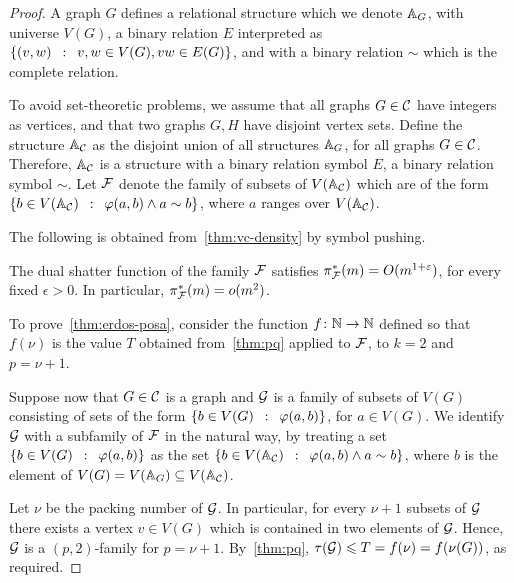 \begin{proof}
	A graph $G$ %
	defines a relational structure which we denote 
	$\str A_{G}$, with universe $V(G)$,
	a binary relation $E$ interpreted as $\setof{(v,w)}{v,w\in V(G),vw\in E(G)}$,  
	and with a binary relation $\sim$ which is the complete relation.
	
	To avoid set-theoretic problems, we assume that all graphs $G\in \CCC$ have integers as vertices, and that two graphs $G,H$ have disjoint vertex sets.
		Define the structure $\str A_{\CCC}$ as the disjoint union of all structures $\str A_{G}$,
	for all graphs $G\in \CCC$. Therefore, $\str A_{\CCC}$
	is a structure with a binary relation symbol $E$,
	a binary relation symbol $\sim$. Let $\cal F$ denote the
	family of subsets of $V(\str A_{\CCC})$
which are of the form
$\setof{b\in V(\str A_{\CCC})} {\phi(a,b)\land a\sim b}$, where $a$ ranges over  $V(\str A_{\CCC})$.

The following is obtained from~\cref{thm:vc-density} by symbol pushing.
\begin{claim}
	The dual shatter function of the family $\cal F$ satisfies	$\pi^*_{\cal F}(m)=O(m^{1+\epsilon})$,
	 for every fixed $\epsilon>0$.
In particular, $\pi^*_{\cal F}(m)=o(m^{2})$.
\end{claim}

To prove~\cref{thm:erdos-posa},
consider the function $f\from \N \to \N$
defined so that $f(\nu)$ is the value $T$ obtained from~\cref{thm:pq} applied to $\cal F$, to $k=2$ and $p=\nu+1$.

Suppose now that $G\in \CCC$ is a graph and $\GGG$
is a family of subsets of $V(G)$ consisting of sets of the form $\setof{b\in V(G)}{\phi(a,b)}$, for $a\in V(G)$.
We identify $\GGG$ with a subfamily of $\FFF$ in the natural way, by treating a set $\setof{b\in V(G)}{\phi(a,b)}$
as the set $\setof{b\in V(\str A_{\cal C})}{\phi(a,b)\land a\sim b}$,
where $b$ is the element of $V(G)=V(\str A_G)\subset V(\str A_{\CCC})$.

Let $\nu$ be the packing number of $\GGG$.
In particular, for every $\nu+1$ subsets of $\GGG$
there exists a vertex $v\in V(G)$
which is contained in two elements of $\GGG$.
Hence, $\GGG$ is a $(p,2)$-family for $p=\nu+1$.
By~\cref{thm:pq}, $\tau(\GGG)\le T=f(\nu)=f(\nu(G))$,  as required.
\end{proof}
